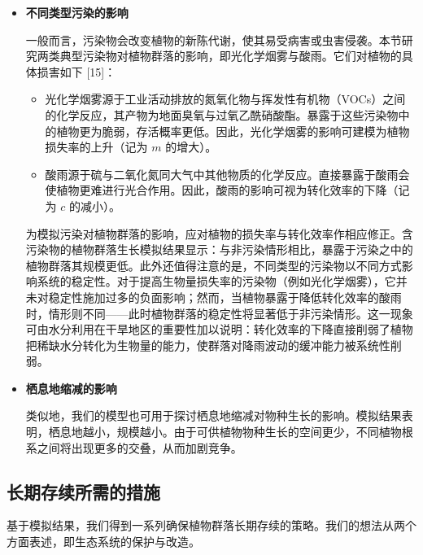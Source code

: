 \documentclass[11pt,a4paper]{ctexart}
\begin{document}
\begin{itemize}
\item \textbf{不同类型污染的影响}

一般而言，污染物会改变植物的新陈代谢，使其易受病害或虫害侵袭。本节研究两类典型污染物对植物群落的影响，即光化学烟雾与酸雨。它们对植物的具体损害如下 [15]：

\begin{itemize}
\item 光化学烟雾源于工业活动排放的氮氧化物与挥发性有机物（VOCs）之间的化学反应，其产物为地面臭氧与过氧乙酰硝酸酯。暴露于这些污染物中的植物更为脆弱，存活概率更低。因此，光化学烟雾的影响可建模为植物损失率的上升（记为 $m$ 的增大）。
\item 酸雨源于硫与二氧化氮同大气中其他物质的化学反应。直接暴露于酸雨会使植物更难进行光合作用。因此，酸雨的影响可视为转化效率的下降（记为 $c$ 的减小）。
\end{itemize}

为模拟污染对植物群落的影响，应对植物的损失率与转化效率作相应修正。含污染物的植物群落生长模拟结果显示：与非污染情形相比，暴露于污染之中的植物群落其规模更低。此外还值得注意的是，不同类型的污染物以不同方式影响系统的稳定性。对于提高生物量损失率的污染物（例如光化学烟雾），它并未对稳定性施加过多的负面影响；然而，当植物暴露于降低转化效率的酸雨时，情形则不同——此时植物群落的稳定性将显著低于非污染情形。这一现象可由水分利用在干旱地区的重要性加以说明：转化效率的下降直接削弱了植物把稀缺水分转化为生物量的能力，使群落对降雨波动的缓冲能力被系统性削弱。

\item \textbf{栖息地缩减的影响}

类似地，我们的模型也可用于探讨栖息地缩减对物种生长的影响。模拟结果表明，栖息地越小，规模越小。由于可供植物物种生长的空间更少，不同植物根系之间将出现更多的交叠，从而加剧竞争。
\end{itemize}

\subsection{长期存续所需的措施}

基于模拟结果，我们得到一系列确保植物群落长期存续的策略。我们的想法从两个方面表述，即生态系统的保护与改造。
\end{document}

